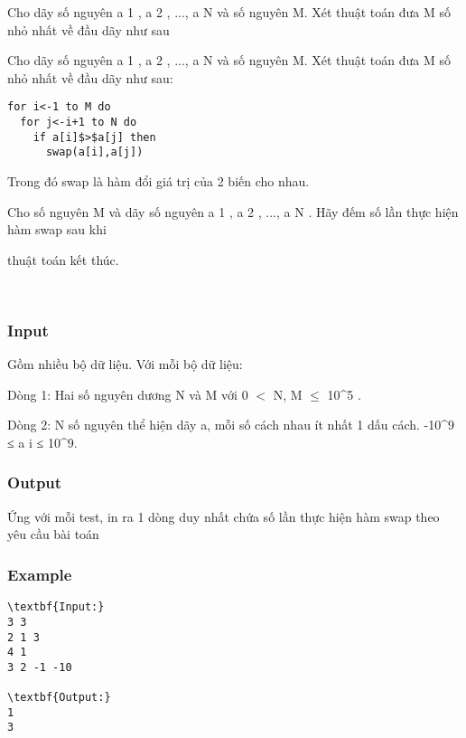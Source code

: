 

Cho dãy số nguyên a 1 , a 2 , ..., a N và số nguyên M. Xét thuật toán đưa M số nhỏ nhất về đầu dãy như sau

Cho dãy số nguyên a 1 , a 2 , ..., a N và số nguyên M. Xét thuật toán đưa M số nhỏ nhất về đầu dãy như sau:
\begin{verbatim}
for i<-1 to M do
  for j<-i+1 to N do
    if a[i]$>$a[j] then
      swap(a[i],a[j])\end{verbatim}

Trong đó swap là hàm đổi giá trị của 2 biến cho nhau.

Cho số nguyên M và dãy số nguyên a 1 , a 2 , ..., a N . Hãy đếm số lần thực hiện hàm swap sau khi

thuật toán kết thúc.

 

\subsubsection{Input}

Gồm nhiều bộ dữ liệu. Với mỗi bộ dữ liệu:

Dòng 1: Hai số nguyên dương N và M với 0 $<$ N, M  $\le$  10^5 .

Dòng 2: N số nguyên thể hiện dãy a, mỗi số cách nhau ít nhất 1 dấu cách. -10^9 ≤ a i ≤ 10^9.

\subsubsection{Output}

Ứng với mỗi test, in ra 1 dòng duy nhất chứa số lần thực hiện hàm swap theo yêu cầu bài toán

\subsubsection{Example}
\begin{verbatim}
\textbf{Input:}
3 3
2 1 3
4 1
3 2 -1 -10

\textbf{Output:}
1
3\end{verbatim}
